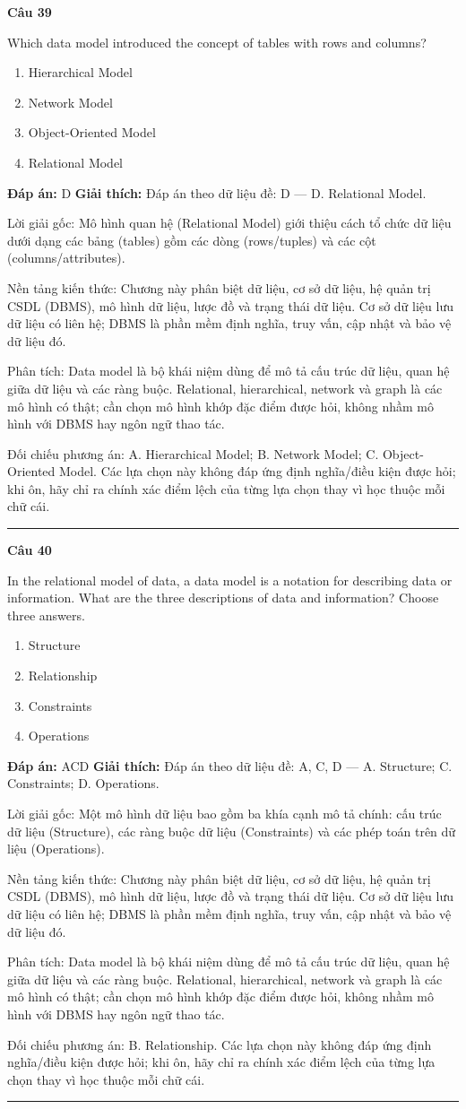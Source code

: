\documentclass[11pt,a4paper]{article}
\newenvironment{question}[1]{%
  \par\vspace{1em}\noindent\textbf{\large Câu #1}\par\vspace{0.4em}
}{%
  \par\vspace{1em}\hrule\vspace{0.6em}
}
\newenvironment{choices}{%
  \begin{enumerate}[label=\textbf{\Alph*.},leftmargin=2.2em,itemsep=2pt,topsep=3pt]
}{%
  \end{enumerate}
}
\newcommand{\choice}{\item}
\begin{document}
\begin{question}{39}
Which data model introduced the concept of tables with rows and columns?
\begin{choices}
\choice Hierarchical Model
\choice Network Model
\choice Object-Oriented Model
\choice Relational Model
\end{choices}
\textbf{Đáp án:} D
\textbf{Giải thích:} Đáp án theo dữ liệu đề: D — D. Relational Model.

Lời giải gốc: Mô hình quan hệ (Relational Model) giới thiệu cách tổ chức dữ liệu dưới dạng các bảng (tables) gồm các dòng (rows/tuples) và các cột (columns/attributes).

Nền tảng kiến thức: Chương này phân biệt dữ liệu, cơ sở dữ liệu, hệ quản trị CSDL (DBMS), mô hình dữ liệu, lược đồ và trạng thái dữ liệu. Cơ sở dữ liệu lưu dữ liệu có liên hệ; DBMS là phần mềm định nghĩa, truy vấn, cập nhật và bảo vệ dữ liệu đó.

Phân tích: Data model là bộ khái niệm dùng để mô tả cấu trúc dữ liệu, quan hệ giữa dữ liệu và các ràng buộc. Relational, hierarchical, network và graph là các mô hình có thật; cần chọn mô hình khớp đặc điểm được hỏi, không nhầm mô hình với DBMS hay ngôn ngữ thao tác.

Đối chiếu phương án: A. Hierarchical Model; B. Network Model; C. Object-Oriented Model. Các lựa chọn này không đáp ứng định nghĩa/điều kiện được hỏi; khi ôn, hãy chỉ ra chính xác điểm lệch của từng lựa chọn thay vì học thuộc mỗi chữ cái.
\end{question}

\begin{question}{40}
In the relational model of data, a data model is a notation for describing data or information. What are the three descriptions of data and information? Choose three answers.
\begin{choices}
\choice Structure
\choice Relationship
\choice Constraints
\choice Operations
\end{choices}
\textbf{Đáp án:} ACD
\textbf{Giải thích:} Đáp án theo dữ liệu đề: A, C, D — A. Structure; C. Constraints; D. Operations.

Lời giải gốc: Một mô hình dữ liệu bao gồm ba khía cạnh mô tả chính: cấu trúc dữ liệu (Structure), các ràng buộc dữ liệu (Constraints) và các phép toán trên dữ liệu (Operations).

Nền tảng kiến thức: Chương này phân biệt dữ liệu, cơ sở dữ liệu, hệ quản trị CSDL (DBMS), mô hình dữ liệu, lược đồ và trạng thái dữ liệu. Cơ sở dữ liệu lưu dữ liệu có liên hệ; DBMS là phần mềm định nghĩa, truy vấn, cập nhật và bảo vệ dữ liệu đó.

Phân tích: Data model là bộ khái niệm dùng để mô tả cấu trúc dữ liệu, quan hệ giữa dữ liệu và các ràng buộc. Relational, hierarchical, network và graph là các mô hình có thật; cần chọn mô hình khớp đặc điểm được hỏi, không nhầm mô hình với DBMS hay ngôn ngữ thao tác.

Đối chiếu phương án: B. Relationship. Các lựa chọn này không đáp ứng định nghĩa/điều kiện được hỏi; khi ôn, hãy chỉ ra chính xác điểm lệch của từng lựa chọn thay vì học thuộc mỗi chữ cái.
\end{question}
\end{document}
